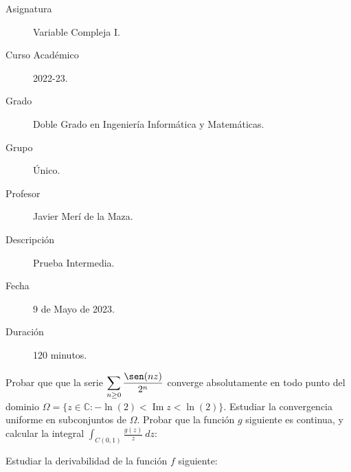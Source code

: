 \documentclass[12pt]{article}
\renewcommand{\Im}{\operatorname{Im}}
\begin{document}

    
    

    \begin{description}
        \item[Asignatura] Variable Compleja I.
        \item[Curso Académico] 2022-23.
        \item[Grado] Doble Grado en Ingeniería Informática y Matemáticas.
        \item[Grupo] Único.
        \item[Profesor] Javier Merí de la Maza.
        \item[Descripción] Prueba Intermedia.
        \item[Fecha] 9 de Mayo de 2023.
        \item[Duración] 120 minutos.
    
    \end{description}
    \newpage

    \begin{ejercicio}[4 puntos]
        Probar que que la serie $\displaystyle \sum_{n\geq 0} \frac{\sen(nz)}{2^n}$ converge absolutamente en todo punto del dominio $\Omega=\{z \in \mathbb{C} : -\ln(2) < \Im z < \ln(2)\}$. Estudiar la convergencia uniforme en subconjuntos de $\Omega$. Probar que la función $g$ siguiente es continua, y calcular la integral $\displaystyle \int_{C(0,1)} \frac{g(z)}{z}\ dz$:
    \end{ejercicio}

    \begin{ejercicio}[2 puntos]
        Estudiar la derivabilidad de la función $f$ siguiente:
    \end{ejercicio}
\end{document}
